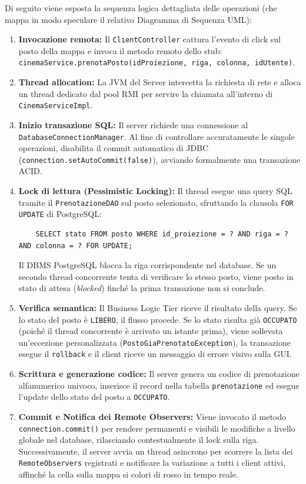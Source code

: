 \documentclass{article}
\begin{document}
Di seguito viene esposta la sequenza logica dettagliata delle operazioni (che mappa in modo speculare il relativo Diagramma di Sequenza UML):

\begin{enumerate}
    \item \textbf{Invocazione remota:} Il \texttt{ClientController} cattura l'evento di click sul posto della mappa e invoca il metodo remoto dello stub: \texttt{cinemaService.prenotaPosto(idProiezione, riga, colonna, idUtente)}.
    \item \textbf{Thread allocation:} La JVM del Server intercetta la richiesta di rete e alloca un thread dedicato dal pool RMI per servire la chiamata all'interno di \texttt{CinemaServiceImpl}.
    \item \textbf{Inizio transazione SQL:} Il server richiede una connessione al \texttt{DatabaseConnectionManager}. Al fine di controllare accuratamente le singole operazioni, disabilita il commit automatico di JDBC (\texttt{connection.setAutoCommit(false)}), avviando formalmente una transazione ACID.
    \item \textbf{Lock di lettura (Pessimistic Locking):} Il thread esegue una query SQL tramite il \texttt{PrenotazioneDAO} sul posto selezionato, sfruttando la clausola \texttt{FOR UPDATE} di PostgreSQL:
    \begin{verbatim}
    SELECT stato FROM posto WHERE id_proiezione = ? AND riga = ? AND colonna = ? FOR UPDATE;
    \end{verbatim}
    Il DBMS PostgreSQL blocca la riga corrispondente nel database. Se un secondo thread concorrente tenta di verificare lo stesso posto, viene posto in stato di attesa (\textit{blocked}) finché la prima transazione non si conclude.
    \item \textbf{Verifica semantica:} Il Business Logic Tier riceve il risultato della query. Se lo stato del posto è \texttt{LIBERO}, il flusso procede. Se lo stato risulta già \texttt{OCCUPATO} (poiché il thread concorrente è arrivato un istante prima), viene sollevata un'eccezione personalizzata (\texttt{PostoGiaPrenotatoException}), la transazione esegue il \texttt{rollback} e il client riceve un messaggio di errore visivo sulla GUI.
    \item \textbf{Scrittura e generazione codice:} Il server genera un codice di prenotazione alfanumerico univoco, inserisce il record nella tabella \texttt{prenotazione} ed esegue l'update dello stato del posto a \texttt{OCCUPATO}.
    \item \textbf{Commit e Notifica dei Remote Observers:} Viene invocato il metodo \texttt{connection.commit()} per rendere permanenti e visibili le modifiche a livello globale nel database, rilasciando contestualmente il lock sulla riga. Successivamente, il server avvia un thread asincrono per scorrere la lista dei \texttt{RemoteObservers} registrati e notificare la variazione a tutti i client attivi, affinché la cella sulla mappa si colori di rosso in tempo reale.

\end{enumerate}
\end{document}
